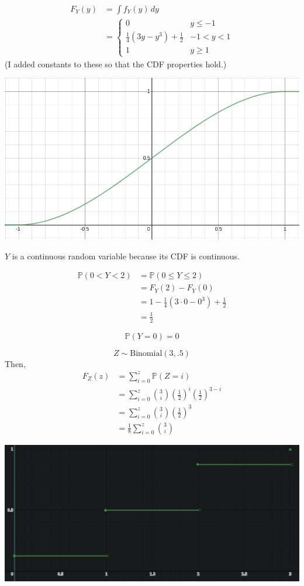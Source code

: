 \documentclass[12pt]{article}
\begin{document}
\newpage
{}
\begin{align*}
    F_Y(y) &= \int f_Y(y)\,dy \\
           &= \begin{cases} 0 & y \leq -1 \\ \frac14(3y-y^3) + \frac12 & -1 < y < 1 \\ 1 & y \geq 1\end{cases}
\end{align*}
(I added constants to these so that the CDF properties hold.)

\begin{center}\includegraphics[scale=.5]{capture4.png}\end{center}

$Y$ is a continuous random variable because its CDF is continuous.

\medskip
{}
\begin{align*}
    \mathbb P(0 < Y < 2) &= \mathbb P(0 \leq Y \leq 2) \\
                         &= F_Y(2) - F_Y(0) \\
                         &= 1 - \frac14(3\cdot0 - 0^3) + \frac12 \\
                         &= \frac12
\end{align*}

\medskip
{} $$\mathbb P(Y = 0) = 0$$

\newpage
{} $$Z\sim{\text{Binomial}(3, .5)}$$
Then,
\begin{align*}
    F_Z(z) &= \sum_{i=0}^z \mathbb P(Z = i) \\
           &= \sum_{i=0}^z {3 \choose i}\left(\frac12\right)^i\left(\frac12\right)^{3-i} \\
           &= \sum_{i=0}^z {3 \choose i}\left(\frac{1}{2}\right)^{3} \\
           &= \frac18\sum_{i=0}^z {3 \choose i}
\end{align*}

\begin{center}\includegraphics[scale=.5]{capture5.png}\end{center}
\end{document}
